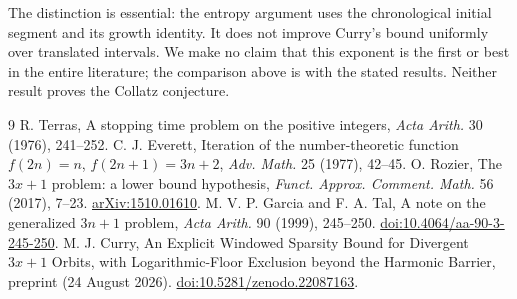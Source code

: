 \documentclass[11pt]{article}
\begin{document}
The distinction is essential: the entropy argument uses the chronological initial segment and its growth identity. It does not improve Curry's bound uniformly over translated intervals. We make no claim that this exponent is the first or best in the entire literature; the comparison above is with the stated results. Neither result proves the Collatz conjecture.

\begin{thebibliography}{9}\small
{} R. Terras, A stopping time problem on the positive integers, \emph{Acta Arith.} 30 (1976), 241--252.
 C. J. Everett, Iteration of the number-theoretic function $f(2n)=n$, $f(2n+1)=3n+2$, \emph{Adv. Math.} 25 (1977), 42--45.
 O. Rozier, The $3x+1$ problem: a lower bound hypothesis, \emph{Funct. Approx. Comment. Math.} 56 (2017), 7--23. \href{https://arxiv.org/abs/1510.01610}{arXiv:1510.01610}.
 M. V. P. Garcia and F. A. Tal, A note on the generalized $3n+1$ problem, \emph{Acta Arith.} 90 (1999), 245--250. \href{https://doi.org/10.4064/aa-90-3-245-250}{doi:10.4064/aa-90-3-245-250}.
 M. J. Curry, An Explicit Windowed Sparsity Bound for Divergent $3x+1$ Orbits, with Logarithmic-Floor Exclusion beyond the Harmonic Barrier, preprint (24 August 2026). \href{https://doi.org/10.5281/zenodo.22087163}{doi:10.5281/zenodo.22087163}.
\end{thebibliography}
\end{document}

